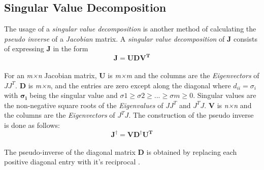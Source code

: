 \subsection{Singular Value Decomposition}
The usage of a \textit{singular value decomposition} is another method of calculating the \textit{pseudo inverse} of a \textit{Jacobian} matrix. A \textit{singular value decomposition} of \textbf{J} consists of expressing \textbf{J} in the form\\
\begin{equation}
\pmb{J} = \pmb{UDV^{T}}
\end{equation} 
\\For an \textit{m×n} Jacobian matrix, \textbf{U} is\textit{ m×m} and the columns are the \textit{Eigenvectors} of $JJ^{T}$. \textbf{D} is \textit{m×n}, and the entries are zero except along the diagonal where $d_{ii}=\sigma_{i}$ with $\pmb{\sigma_{i}}$ being the singular value and $\sigma 1\geq \sigma 2 \geq ...\geq \sigma m \geq 0$. Singular values are the non-negative square roots of the \textit{Eigenvalues} of $JJ^{T}$ and $ J^{T}J$. \textbf{V} is \textit{n×n} and the columns are the \textit{Eigenvectors} of $J^{T}J$.
The construction of the pseudo inverse is done as follows:\\
\begin{equation}
\pmb{J}^{\dagger} = \pmb{VD^{\dagger}U^{T}}
\end{equation} 
\\The pseudo-inverse of the diagonal matrix \textbf{D} is obtained by replacing each positive diagonal entry with it's reciprocal \cite{Golub.1965}.
